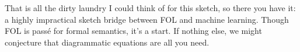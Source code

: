 \begin{fullwidth}
That is all the dirty laundry I could think of for this sketch, so there you have it: a highly impractical sketch bridge between FOL and machine learning. Though FOL is passé for formal semantics, it's a start. If nothing else, we might conjecture that diagrammatic equations are all you need.

\end{fullwidth}